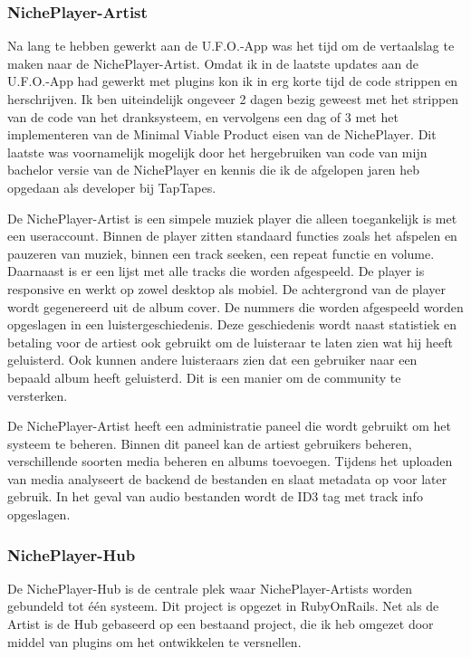 \subsubsection*{NichePlayer-Artist}
Na lang te hebben gewerkt aan de U.F.O.-App was het tijd om de vertaalslag te maken naar de NichePlayer-Artist. Omdat ik in de laatste updates aan de U.F.O.-App had gewerkt met plugins kon ik in erg korte tijd de code strippen en herschrijven. Ik ben uiteindelijk ongeveer 2 dagen bezig geweest met het strippen van de code van het dranksysteem, en vervolgens een dag of 3 met het implementeren van de Minimal Viable Product eisen van de NichePlayer. Dit laatste was voornamelijk mogelijk door het hergebruiken van code van mijn bachelor versie van de NichePlayer en kennis die ik de afgelopen jaren heb opgedaan als developer bij TapTapes.

De NichePlayer-Artist is een simpele muziek player die alleen toegankelijk is met een useraccount. Binnen de player zitten standaard functies zoals het afspelen en pauzeren van muziek, binnen een track seeken, een repeat functie en volume. Daarnaast is er een lijst met alle tracks die worden afgespeeld. De player is responsive en werkt op zowel desktop als mobiel. De achtergrond van de player wordt gegenereerd uit de album cover. De nummers die worden afgespeeld worden opgeslagen in een luistergeschiedenis. Deze geschiedenis wordt naast statistiek en betaling voor de artiest ook gebruikt om de luisteraar te laten zien wat hij heeft geluisterd. Ook kunnen andere luisteraars zien dat een gebruiker naar een bepaald album heeft geluisterd. Dit is een manier om de community te versterken.

De NichePlayer-Artist heeft een administratie paneel die wordt gebruikt om het systeem te beheren. Binnen dit paneel kan de artiest gebruikers beheren, verschillende soorten media beheren en albums toevoegen. Tijdens het uploaden van media analyseert de backend de bestanden en slaat metadata op voor later gebruik. In het geval van audio bestanden wordt de ID3 tag met track info opgeslagen.

\subsubsection*{NichePlayer-Hub}
De NichePlayer-Hub is de centrale plek waar NichePlayer-Artists worden gebundeld tot één systeem. Dit project is opgezet in RubyOnRails. Net als de Artist is de Hub gebaseerd op een bestaand project, die ik heb omgezet door middel van plugins om het ontwikkelen te versnellen.

